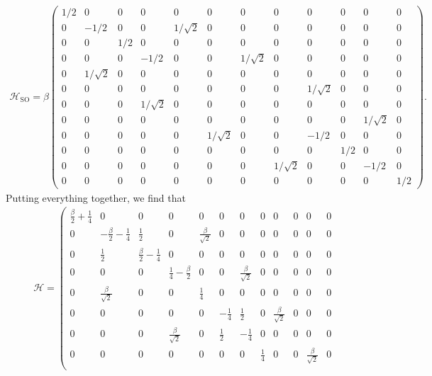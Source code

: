 \documentclass{article}
\theoremstyle{definition}
\newcommand{\ham}{\mathcal{H}}
\newcommand{\be}{\beta}
\begin{document}
\begin{enumerate}[label=(\alph*)]
	\begin{align*}
	\ham_{\text{SO}} = 
	\be\begin{pmatrix*}
	1/2 & 0 & 0 & 0 & 0 & 0 & 0 & 0 & 0 & 0 & 0 & 0 \\
	0 & -1/2 & 0 & 0 & 1/\sqrt{2} & 0 & 0 & 0 & 0 & 0 & 0 & 0 \\
	0 & 0 & 1/2 & 0 & 0 & 0 & 0 & 0 & 0 & 0 & 0 & 0 \\
	0 & 0 & 0 & -1/2 & 0 & 0 & 1/\sqrt{2} & 0 & 0 & 0 & 0 & 0 \\
	0 & 1/\sqrt{2} & 0 & 0 & 0 & 0 & 0 & 0 & 0 & 0 & 0 & 0 \\
	0 & 0 & 0 & 0 & 0 & 0 & 0 & 0 & 1/\sqrt{2} & 0 & 0 & 0 \\
	0 & 0 & 0 & 1/\sqrt{2} & 0 & 0 & 0 & 0 & 0 & 0 & 0 & 0 \\
	0 & 0 & 0 & 0 & 0 & 0 & 0 & 0 & 0 & 0 & 1/\sqrt{2} & 0 \\
	0 & 0 & 0 & 0 & 0 & 1/\sqrt{2} & 0 & 0 & -1/2 & 0 & 0 & 0 \\
	0 & 0 & 0 & 0 & 0 & 0 & 0 & 0 & 0 & 1/2 & 0 & 0 \\
	0 & 0 & 0 & 0 & 0 & 0 & 0 & 1/\sqrt{2} & 0 & 0 & -1/2 & 0 \\
	0 & 0 & 0 & 0 & 0 & 0 & 0 & 0 & 0 & 0 & 0 & 1/2 
	\end{pmatrix*}.
	\end{align*}
	Putting everything together, we find that
	\begin{align*}
	\ham = \left(
	\begin{array}{cccccccccccc}
	\frac{\beta }{2}+\frac{1}{4} & 0 & 0 & 0 & 0 & 0 & 0 & 0 & 0 & 0 & 0 & 0
	\\
	0 & -\frac{\beta }{2}-\frac{1}{4} & \frac{1}{2} & 0 & \frac{\beta
	}{\sqrt{2}} & 0 & 0 & 0 & 0 & 0 & 0 & 0 \\
	0 & \frac{1}{2} & \frac{\beta }{2}-\frac{1}{4} & 0 & 0 & 0 & 0 & 0 & 0 &
	0 & 0 & 0 \\
	0 & 0 & 0 & \frac{1}{4}-\frac{\beta }{2} & 0 & 0 & \frac{\beta
	}{\sqrt{2}} & 0 & 0 & 0 & 0 & 0 \\
	0 & \frac{\beta }{\sqrt{2}} & 0 & 0 & \frac{1}{4} & 0 & 0 & 0 & 0 & 0 &
	0 & 0 \\
	0 & 0 & 0 & 0 & 0 & -\frac{1}{4} & \frac{1}{2} & 0 & \frac{\beta
	}{\sqrt{2}} & 0 & 0 & 0 \\
	0 & 0 & 0 & \frac{\beta }{\sqrt{2}} & 0 & \frac{1}{2} & -\frac{1}{4} & 0
	& 0 & 0 & 0 & 0 \\
	0 & 0 & 0 & 0 & 0 & 0 & 0 & \frac{1}{4} & 0 & 0 & \frac{\beta
	}{\sqrt{2}} & 0 \\

\end{array}
\end{align*}
\end{enumerate}
\end{document}
